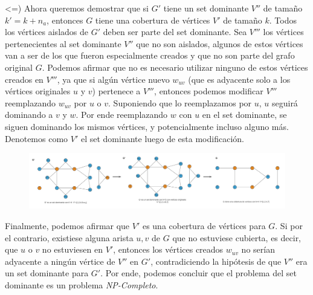 \documentclass[../tp3_grupo404.tex]{subfiles}
\begin{document}
<=) Ahora queremos demostrar que si $G'$ tiene un set dominante $V''$ de tamaño $k'=k+n_{a}$, entonces $G$ tiene una 
cobertura de vértices $V'$ de tamaño $k$. Todos los vértices aislados de $G'$ deben ser parte del set dominante. 
Sea $V'''$ los vértices pertenecientes al set dominante $V''$ que no son aislados, algunos de estos vértices van 
a ser de los que fueron especialmente creados y que no son parte del grafo original $G$. Podemos afirmar que 
no es necesario utilizar ninguno de estos vértices creados en $V'''$, ya que si algún vértice nuevo $w_{uv}$ 
(que es adyacente solo a los vértices originales $u$ y $v$) pertenece a $V'''$, entonces podemos modificar 
$V'''$ reemplazando $w_{uv}$ por $u$ o $v$. Suponiendo que lo reemplazamos por $u$, $u$ seguirá dominando a $v$ y $w$. 
Por ende reemplazando $w$ con $u$ en el set dominante, se siguen dominando los mismos vértices, y potencialmente 
incluso alguno más. Denotemos como $V'$ el set dominante luego de esta modificación.

\begin{figure}[H]
    \centering
    \includegraphics[width=0.9\linewidth,angle=0,origin=c]{out/dominant_to_vertex.png}
\end{figure}

Finalmente, podemos afirmar que $V'$ es una cobertura de vértices para $G$. Si por el contrario, 
existiese alguna arista ${u,v}$ de $G$ que no estuviese cubierta, es decir, que $u$ o $v$ no estuviesen 
en $V'$, entonces los vértices creados $w_{uv}$ no serían adyacente a ningún vértice de $V''$ en $G'$, 
contradiciendo la hipótesis de que $V''$ era un set dominante para $G'$.
Por ende, podemos concluir que el problema del set dominante es un problema \emph{NP-Completo}.


\end{document}
